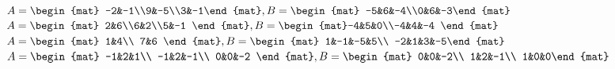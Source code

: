 \begin{Exercise}[
name={},
title={}, 
difficulty=0,
origin={\cite{GH}}]
\begin{multicols}{2}
\Question $A=\begin{mat} -2&-1\\9&-5\\3&-1\end{mat}, \\ B=\begin{mat} -5&6&-4\\0&6&-3\end{mat}$
\Question $A=\begin{mat} 2&6\\6&2\\5&-1 \end{mat}, \\ B=\begin{mat}-4&5&0\\-4&4&-4 \end{mat}$
\Question $A=\begin{mat} 1&4\\  7&6 \end{mat}, \\ B=\begin{mat} 1&-1&-5&5\\  -2&1&3&-5\end{mat}$
\Question $A=\begin{mat} -1&2&1\\  -1&2&-1\\  0&0&-2 \end{mat}, \\ B=\begin{mat} 0&0&-2\\  1&2&-1\\  1&0&0\end{mat}$

\end{multicols}
\end{Exercise}
